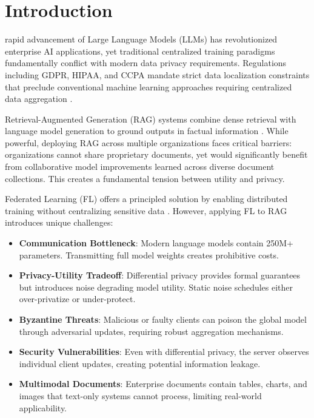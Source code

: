 \documentclass[conference]{IEEEtran}
\begin{document}
\section{Introduction}

 rapid advancement of Large Language Models (LLMs) has revolutionized enterprise AI applications, yet traditional centralized training paradigms fundamentally conflict with modern data privacy requirements. Regulations including GDPR, HIPAA, and CCPA mandate strict data localization constraints that preclude conventional machine learning approaches requiring centralized data aggregation \cite{mcmahan2017communication}.

Retrieval-Augmented Generation (RAG) systems combine dense retrieval with language model generation to ground outputs in factual information \cite{lewis2020retrieval}. While powerful, deploying RAG across multiple organizations faces critical barriers: organizations cannot share proprietary documents, yet would significantly benefit from collaborative model improvements learned across diverse document collections. This creates a fundamental tension between utility and privacy.

Federated Learning (FL) offers a principled solution by enabling distributed training without centralizing sensitive data \cite{yang2019federated}. However, applying FL to RAG introduces unique challenges:

\begin{itemize}
    \item \textbf{Communication Bottleneck}: Modern language models contain 250M+ parameters. Transmitting full model weights creates prohibitive costs.
    
    \item \textbf{Privacy-Utility Tradeoff}: Differential privacy provides formal guarantees but introduces noise degrading model utility. Static noise schedules either over-privatize or under-protect.
    
    \item \textbf{Byzantine Threats}: Malicious or faulty clients can poison the global model through adversarial updates, requiring robust aggregation mechanisms.
    
    \item \textbf{Security Vulnerabilities}: Even with differential privacy, the server observes individual client updates, creating potential information leakage.
    
    \item \textbf{Multimodal Documents}: Enterprise documents contain tables, charts, and images that text-only systems cannot process, limiting real-world applicability.
\end{itemize}
\end{document}

